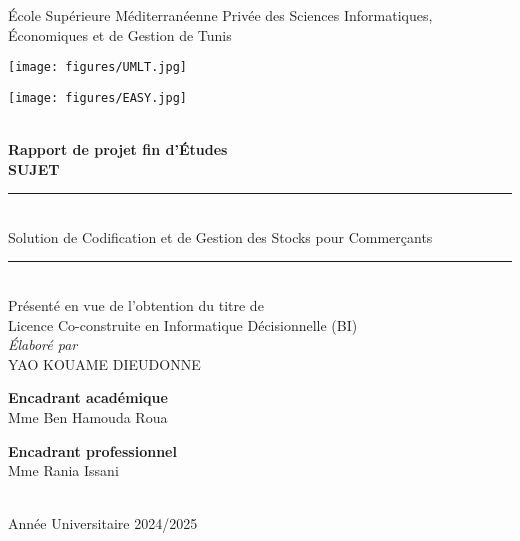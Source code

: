 \documentclass[12pt,a4paper]{report}
\begin{document}
\begin{titlepage}
  \centering

  {\large École Supérieure Méditerranéenne Privée des Sciences Informatiques, Économiques et de Gestion de Tunis}\\[1.5cm]

  \begin{minipage}{0.45\textwidth}\raggedright
    \texttt{[image: figures/UMLT.jpg]}
  \end{minipage}%
  \hfill
  \begin{minipage}{0.45\textwidth}\raggedleft
    \texttt{[image: figures/EASY.jpg]}
  \end{minipage}\\[1.5cm]

  {\LARGE\bfseries Rapport de projet fin d’Études}\\[1cm]

  {\large\bfseries SUJET}\\[-0.2cm]
  \rule{0.8\textwidth}{0.4pt}\\[0.3cm]
  {\Large Solution de Codification et de Gestion des Stocks pour Commerçants}\\[0.3cm]
  \rule{0.8\textwidth}{0.4pt}\\[1cm]

  {\normalsize Présenté en vue de l’obtention du titre de}\\
  {\normalsize Licence Co-construite en Informatique Décisionnelle (BI)}\\[1.5cm]

  {\itshape Élaboré par}\\
  {\large YAO KOUAME DIEUDONNE}\\[1.5cm]

  \begin{minipage}{0.45\textwidth}\centering
    {\bfseries Encadrant académique}\\
    Mme Ben Hamouda Roua
  \end{minipage}%
  \hfill
  \begin{minipage}{0.45\textwidth}\centering
    {\bfseries Encadrant professionnel}\\
    Mme Rania Issani
  \end{minipage}\\[2cm]

  {\normalsize Année Universitaire 2024/2025}

\end{titlepage}
\end{document}
